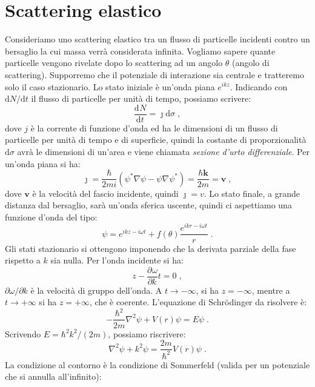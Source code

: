 \documentclass[10pt,a4paper]{report}
\theoremstyle{definition}
\newcommand{\pdev}[3][]{\frac{\partial^{#1} #2}{\partial #3^{#1}}}
\newcommand{\dev}[3][]{\frac{\mathrm{d}^{#1} #2}{\mathrm{d} #3^{#1}}}
\numberwithin{equation}{section}
\newcommand{\diff}[1][]{\mathrm{d}#1}
\newcommand{\Sch}{Schrödinger}
\begin{document}
\section{Scattering elastico}
Consideriamo uno scattering elastico tra un flusso di particelle incidenti contro un bersaglio la cui massa verrà considerata infinita. Vogliamo sapere quante particelle vengono rivelate dopo lo scattering ad un angolo $\theta$ (angolo di scattering). Supporremo che il potenziale di interazione sia centrale e tratteremo solo il caso stazionario. Lo stato iniziale è un'onda piana $e^{ikz}$. Indicando con $\diff{N}/\diff{t}$ il flusso di particelle per unità di tempo, possiamo scrivere:
\begin{equation}
\dev{N}{t}=\jmath\diff{\sigma}\;,
\end{equation}
dove $j$ è la corrente di funzione d'onda ed ha le dimensioni di un flusso di particelle per unità di tempo e di superficie, quindi la costante di proporzionalità $\diff{\sigma}$ avrà le dimensioni di un'area e viene chiamata \emph{sezione d'urto differenziale}. Per un'onda piana si ha:
\begin{equation}
\boldsymbol{\jmath}=\frac{\hbar}{2mi}(\psi^*\nabla\psi-\psi\nabla\psi^*)=\frac{\hbar\mathbf{k}}{2m}=\mathbf{v}\;,
\end{equation}
dove $\mathbf{v}$ è la velocità del fascio incidente, quindi $\jmath=v$. Lo stato finale, a grande distanza dal bersaglio, sarà un'onda sferica uscente, quindi ci aspettiamo una funzione d'onda del tipo:
\begin{equation}
\psi=e^{ikz-i\omega t}+f(\theta)\frac{e^{ikr-i\omega t}}{r}\;.
\end{equation}
Gli stati stazionario si ottengono imponendo che la derivata parziale della fase rispetto a $k$ sia nulla. Per l'onda incidente si ha:
\begin{equation}
z-\pdev{\omega}{k}t=0\;,
\end{equation}
$\partial\omega/\partial k$ è la velocità di gruppo dell'onda. A $t\to -\infty$, si ha $z=-\infty$, mentre a $t\to+\infty$ si ha $z=+\infty$, che è coerente. L'equazione di \Sch\; da risolvere è:
\begin{equation}
-\frac{\hbar^2}{2m}\nabla^2\psi+V(r)\psi=E\psi\;.
\end{equation}
Scrivendo $E=\hbar^2k^2/(2m)$, possiamo riscrivere:
\begin{equation}
\nabla^2\psi+k^2\psi=\frac{2m}{\hbar^2}V(r)\psi\;.
\end{equation}
La condizione al contorno è la condizione di Sommerfeld (valida per un potenziale che si annulla all'infinito):
\end{document}
